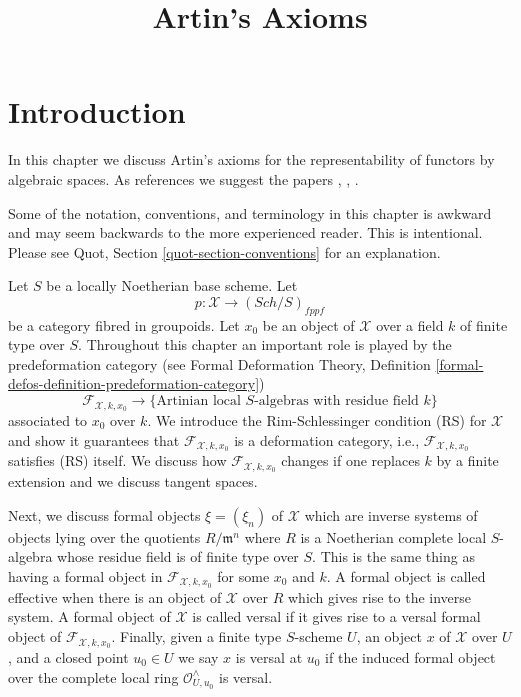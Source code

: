 \documentclass{stacks-project}
\theoremstyle{plain}
\theoremstyle{definition}
\theoremstyle{remark}
\numberwithin{equation}{subsection}
\def\Sch{\mathit{Sch}}
\begin{document}
\title{Artin's Axioms}

\maketitle

\label{section-phantom}

\tableofcontents




\section{Introduction}
\label{section-introduction}

\noindent
In this chapter we discuss Artin's axioms for the representability of
functors by algebraic spaces. As references we suggest the papers
\cite{ArtinI}, \cite{ArtinII}, \cite{ArtinVersal}.

\medskip\noindent
Some of the notation, conventions, and terminology in this chapter is awkward
and may seem backwards to the more experienced reader. This is intentional.
Please see Quot, Section \ref{quot-section-conventions} for an
explanation.

\medskip\noindent
Let $S$ be a locally Noetherian base scheme. Let
$$
p : \mathcal{X} \longrightarrow (\Sch/S)_{fppf}
$$
be a category fibred in groupoids. Let $x_0$ be an object of $\mathcal{X}$
over a field $k$ of finite type over $S$. Throughout this chapter an important
role is played by the predeformation category
(see Formal Deformation Theory,
Definition \ref{formal-defos-definition-predeformation-category})
$$
\mathcal{F}_{\mathcal{X}, k, x_0}
\longrightarrow
\{\text{Artinian local }S\text{-algebras with residue field }k\}
$$
associated to $x_0$ over $k$. We introduce the Rim-Schlessinger condition (RS)
for $\mathcal{X}$ and show it guarantees that
$\mathcal{F}_{\mathcal{X}, k, x_0}$ is a deformation category, i.e.,
$\mathcal{F}_{\mathcal{X}, k, x_0}$ satisfies (RS) itself.
We discuss how $\mathcal{F}_{\mathcal{X}, k, x_0}$
changes if one replaces $k$ by a finite extension
and we discuss tangent spaces.

\medskip\noindent
Next, we discuss formal objects $\xi = (\xi_n)$ of $\mathcal{X}$ which are
inverse systems of objects lying over the quotients $R/\mathfrak m^n$
where $R$ is a Noetherian complete local $S$-algebra whose residue field
is of finite type over $S$. This is the same thing as having a formal
object in $\mathcal{F}_{\mathcal{X}, k, x_0}$ for some $x_0$ and $k$.
A formal object is called effective when there is an object of
$\mathcal{X}$ over $R$ which gives rise to the inverse system.
A formal object of $\mathcal{X}$ is called versal if it gives rise to a
versal formal object of $\mathcal{F}_{\mathcal{X}, k, x_0}$.
Finally, given a finite type $S$-scheme $U$, an object $x$
of $\mathcal{X}$ over $U$, and a closed point $u_0 \in U$ we say
$x$ is versal at $u_0$ if the induced formal object over the complete
local ring $\mathcal{O}_{U, u_0}^\wedge$ is versal.
\end{document}
